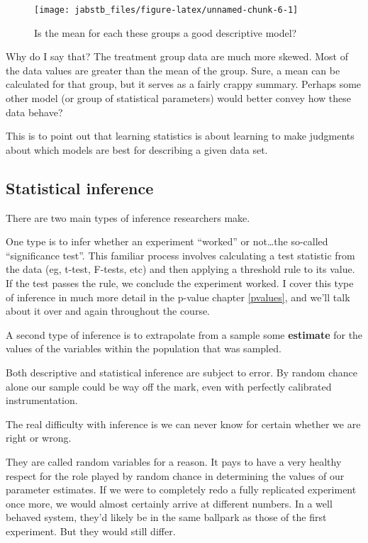 \documentclass[]{book}
\begin{document}
\begin{figure}

{\centering \texttt{[image: jabstb\_files/figure-latex/unnamed-chunk-6-1]} 

}

\caption{Is the mean for each these groups a good descriptive model?}\label{fig:unnamed-chunk-6}
\end{figure}

Why do I say that? The treatment group data are much more skewed. Most of the data values are greater than the mean of the group. Sure, a mean can be calculated for that group, but it serves as a fairly crappy summary. Perhaps some other model (or group of statistical parameters) would better convey how these data behave?

This is to point out that learning statistics is about learning to make judgments about which models are best for describing a given data set.

\hypertarget{statistical-inference}{%
\subsection{Statistical inference}\label{statistical-inference}}

There are two main types of inference researchers make.

One type is to infer whether an experiment ``worked'' or not\ldots{}the so-called ``significance test''. This familiar process involves calculating a test statistic from the data (eg, t-test, F-tests, etc) and then applying a threshold rule to its value. If the test passes the rule, we conclude the experiment worked. I cover this type of inference in much more detail in the p-value chapter \ref{pvalues}, and we'll talk about it over and again throughout the course.

A second type of inference is to extrapolate from a sample some \textbf{estimate} for the values of the variables within the population that was sampled.

Both descriptive and statistical inference are subject to error. By random chance alone our sample could be way off the mark, even with perfectly calibrated instrumentation.

The real difficulty with inference is we can never know for certain whether we are right or wrong.

They are called random variables for a reason. It pays to have a very healthy respect for the role played by random chance in determining the values of our parameter estimates. If we were to completely redo a fully replicated experiment once more, we would almost certainly arrive at different numbers. In a well behaved system, they'd likely be in the same ballpark as those of the first experiment. But they would still differ.
\end{document}
